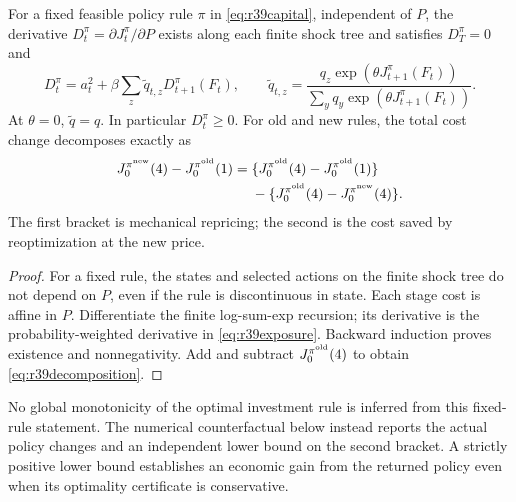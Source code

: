 \begin{proposition}\label{prop:r39exposure}
For a fixed feasible policy rule $\pi$ in \eqref{eq:r39capital}, independent of
$P$, the derivative $D_t^\pi=\partial J_t^\pi/\partial P$ exists along each
finite shock tree and satisfies $D_T^\pi=0$ and
\begin{equation}\label{eq:r39exposure}
 D_t^\pi=a_t^2+\beta\sum_z\widetilde q_{t,z}D_{t+1}^\pi(F_t),\qquad
 \widetilde q_{t,z}=
 \frac{q_z\exp(\theta J_{t+1}^\pi(F_t))}
      {\sum_yq_y\exp(\theta J_{t+1}^\pi(F_t))}.
\end{equation}
At $\theta=0$, $\widetilde q=q$. In particular $D_t^\pi\geq0$.
For old and new rules, the total cost change decomposes exactly as
\begin{align}\label{eq:r39decomposition}
 J_0^{\pi^{\rm new}}(4)-J_0^{\pi^{\rm old}}(1)
 ={}&\{J_0^{\pi^{\rm old}}(4)-J_0^{\pi^{\rm old}}(1)\}\\
 &-\{J_0^{\pi^{\rm old}}(4)-J_0^{\pi^{\rm new}}(4)\}.\nonumber
\end{align}
The first bracket is mechanical repricing; the second is the cost saved by
reoptimization at the new price.
\end{proposition}
\begin{proof}
For a fixed rule, the states and selected actions on the finite shock tree do
not depend on $P$, even if the rule is discontinuous in state. Each stage cost
is affine in $P$. Differentiate the finite log-sum-exp recursion; its derivative
is the probability-weighted derivative in \eqref{eq:r39exposure}. Backward
induction proves existence and nonnegativity. Add and subtract
$J_0^{\pi^{\rm old}}(4)$ to obtain \eqref{eq:r39decomposition}.
\end{proof}

No global monotonicity of the optimal investment rule is inferred from this
fixed-rule statement. The numerical counterfactual below instead reports the
actual policy changes and an independent lower bound on the second bracket.
A strictly positive lower bound establishes an economic gain from the returned
policy even when its optimality certificate is conservative.
